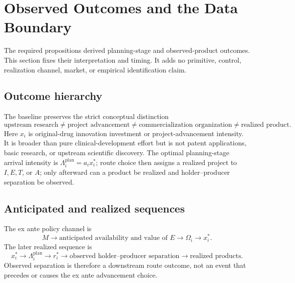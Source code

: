 \section{Observed Outcomes and the Data Boundary}
\label{sec:p09-outcomes}

The required propositions derived planning-stage and observed-product outcomes.
This section fixes their interpretation and timing. It adds no primitive, control,
realization channel, market, or empirical identification claim.

\subsection{Outcome hierarchy}
\label{subsec:p09-hierarchy}

The baseline preserves the strict conceptual distinction
\begin{equation}
  \boxed{
  \text{upstream research}
  \neq
  \text{project advancement}
  \neq
  \text{commercialization organization}
  \neq
  \text{realized product}.}
  \label{eq:p09-outcome-hierarchy}
\end{equation}
Here \(x_i\) is original-drug innovation investment or
project-advancement intensity. It is broader than pure clinical-development
effort but is not patent applications, basic research, or upstream scientific
discovery. The optimal planning-stage arrival intensity is
\(\Lambda_i^{\mathrm{plan}}=a_ix_i^*\); route choice then assigns a realized
project to \(I,E,T\), or \(A\); only afterward can a product be realized and
holder--producer separation be observed.

\subsection{Anticipated and realized sequences}
\label{subsec:p09-sequences}

The ex ante policy channel is
\begin{equation}
  M
  \longrightarrow
  \text{anticipated availability and value of }E
  \longrightarrow
  \Omega_i
  \longrightarrow
  x_i^*.
  \label{eq:p09-anticipated-chain}
\end{equation}
The later realized sequence is
\begin{equation}
  x_i^*
  \longrightarrow
  \Lambda_i^{\mathrm{plan}}
  \longrightarrow
  r_i^*
  \longrightarrow
  \text{observed holder--producer separation}
  \longrightarrow
  \text{realized products}.
  \label{eq:p09-realized-chain}
\end{equation}
Observed separation is therefore a downstream route outcome, not an event
that precedes or causes the ex ante advancement choice.

